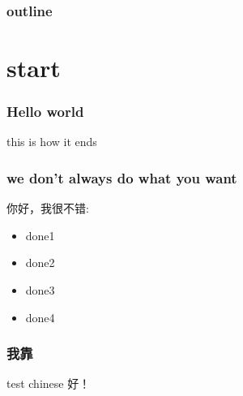 \documentclass[xcolor=x11names,compress]{beamer}
\begin{document}
\maketitle
\begin{frame}
    \frametitle{outline}
    \tableofcontents[pausesections]                                                                                 
\end{frame}
\section{start}
\begin{frame}
\frametitle{Hello world}
this is how it ends
\end{frame}

\begin{frame}
\frametitle{we don't always do what you want}
你好，我很不错:
\begin{itemize}
    \item done1
    \item done2
    \item done3
    \item done4
\end{itemize}
\end{frame}
\begin{frame}
\frametitle{我靠}
\begin{block}{test chinese}
好！
\end{block}
\end{frame}
\end{document}
